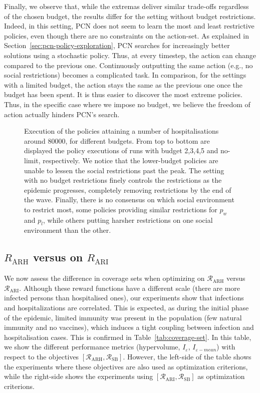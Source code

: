\documentclass{article}
\newcommand{\mdprewardfn}{\mathcal{R}}
\begin{document}
Finally, we observe that, while the extremas deliver similar trade-offs regardless of the chosen budget, the results differ for the setting without budget restrictions. Indeed, in this setting, PCN does not seem to learn the most and least restrictive policies, even though there are no constraints on the action-set. As explained in Section~\ref{sec:pcn-policy-exploration}, PCN searches for increasingly better solutions using a stochastic policy. Thus, at every timestep, the action can change compared to the previous one. Continuously outputting the same action (e.g., no social restrictions) becomes a complicated task. In comparison, for the settings with a limited budget, the action stays the same as the previous one once the budget has been spent. It is thus easier to discover the most extreme policies. Thus, in the specific case where we impose no budget, we believe the freedom of action actually hinders PCN's search. 

\begin{figure}
    \centering
    
    \caption{Execution of the policies attaining a number of hospitalisations around $80000$, for different budgets. From top to bottom are displayed the policy executions of runs with budget 2,3,4,5 and no-limit, respectively. We notice that the lower-budget policies are unable to lessen the social restrictions past the peak. The setting with no budget restrictions finely controls the restrictions as the epidemic progresses, completely removing restrictions by the end of the wave. Finally, there is no consensus on which social environment to restrict most, some policies providing similar restrictions for $p_w$ and $p_l$, while others putting harsher restrictions on one social environment than the other.
    }
    \label{fig:pe-binomial-arh-budgets}
\end{figure}

\subsection{$R_\text{ARH}$ versus on $R_\text{ARI}$}
\label{sec:arh-vs-ari}

We now assess the difference in coverage sets when optimizing on $\mdprewardfn_\text{ARH}$ versus $\mdprewardfn_\text{ARI}$. Although these reward functions have a different scale (there are more infected persons than hospitalised ones), our experiments show that infections and hospitalizations are correlated. This is expected, as during the initial phase of the epidemic, limited immunity was present in the population (few natural immunity and no vaccines), which induces a tight coupling between infection and hospitalisation cases. This is confirmed in Table~\ref{tab:coverage-set}. In this table, we show the different performance metrics (hypervolume, $I_\varepsilon$, $I_{\varepsilon-mean}$) with respect to the objectives $[\mdprewardfn_\text{ARH}, \mdprewardfn_\text{SB}]$. However, the left-side of the table shows the experiments where these objectives are also used as optimization criterions, while the right-side shows the experiments using $[\mdprewardfn_\text{ARI}, \mdprewardfn_\text{SB}]$ as optimization criterions.
\end{document}
